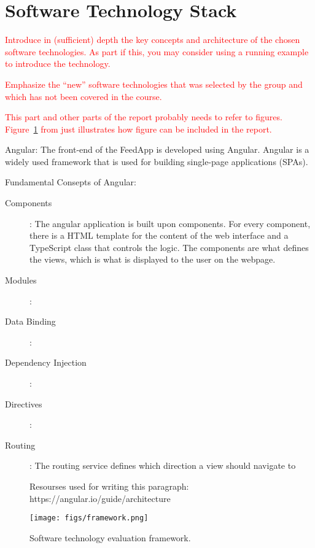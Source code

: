 \section{Software Technology Stack}
\label{sec:technology}

\textcolor{red}{Introduce in (sufficient) depth the key concepts and architecture of the chosen software technologies. As part if this, you may consider using a running example to introduce the technology.}

\textcolor{red}{Emphasize the “new” software technologies that was selected by the group and which has not been covered in the course.}

\textcolor{red}{This part and other parts of the report probably needs to refer to
figures. Figure~\ref{fig:framework} from \cite{brown:96} just
illustrates how figure can be included in the report.}

Angular:
The front-end of the FeedApp is developed using Angular. Angular is a widely used framework that is used for building single-page applications (SPAs).

Fundamental Consepts of Angular: 
\begin{description}
\item[Components]: The angular application is built upon components. For every component, there is a HTML template for the content of the web interface and a TypeScript class that controls the logic. The components are what defines the views, which is what  is displayed to the user on the webpage. 
\item[Modules]:
\item[Data Binding]: 
\item[Dependency Injection]:
\item[Directives]:
\item[Routing]: The routing service defines which direction a view should navigate to

Resourses used for writing this paragraph: https://angular.io/guide/architecture 
\end{description}

\begin{figure}
  \centering
  \texttt{[image: figs/framework.png]}
  \caption{Software technology evaluation framework.}
  \label{fig:framework}
\end{figure}
